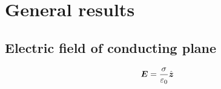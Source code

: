 \section{General results}

\subsection{Electric field of conducting plane}
\begin{equation*}
  \boldsymbol{E} = \frac{\sigma}{\varepsilon_0}\hat{\boldsymbol{z}}
\end{equation*}
